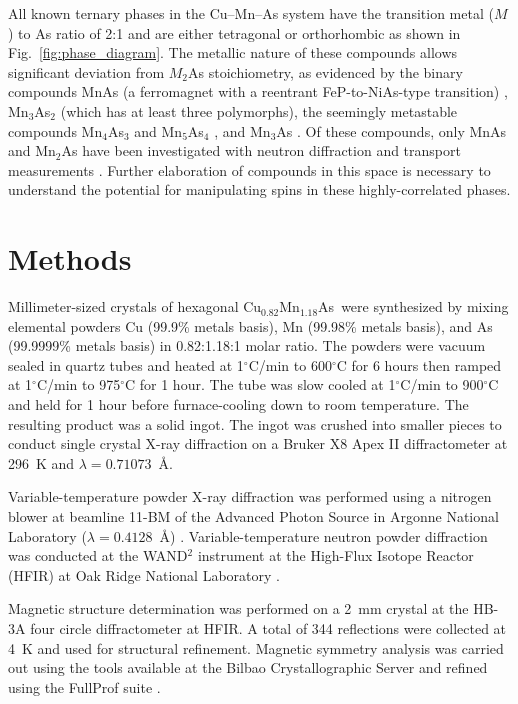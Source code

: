 \documentclass[10pt,doublespacing,edeposit]{uiucthesis2020}
\newcommand*{\cumnas}{Cu$_{0.82}$Mn$_{1.18}$As}
\begin{document}
\begin{mainmatter}
{\color{black} All known ternary phases in the Cu--Mn--As system have the transition metal ($M$) to As ratio of 2:1 and are either tetragonal or orthorhombic as shown in Fig.\ \ref{fig:phase_diagram}.}
The metallic nature of these compounds allows significant deviation from $M_2$As stoichiometry, as evidenced by the binary compounds MnAs (a ferromagnet with a reentrant FeP-to-NiAs-type transition) \cite{Pytlik1985,Schwartz1971,Glazkov2003}, Mn$_3$As$_2$ (which has at least three polymorphs)\cite{Dietrich1990,Moller1993,Hagedorn1994}, the seemingly metastable compounds Mn$_4$As$_3$ and Mn$_5$As$_4$ \cite{Hagedorn1995,Moller1993}, and Mn$_3$As \cite{nowotny_kristallchemische_1951}.
Of these compounds, only MnAs and Mn$_2$As have been investigated with neutron diffraction and transport measurements \cite{Yuzuri1960,Austin1962}.
Further elaboration of compounds in this space is necessary to understand the potential for manipulating spins in these highly-correlated phases.

\section{Methods}

Millimeter-sized crystals of hexagonal \cumnas\ were synthesized by mixing elemental powders Cu (99.9\% metals basis), Mn (99.98\% metals basis), and As (99.9999\% metals basis) in 0.82:1.18:1 molar ratio. 
The powders were vacuum sealed in quartz tubes and heated at 1$^\circ$C/min to 600$^{\circ}$C for 6 hours then ramped at 1$^{\circ}$C/min to 975$^{\circ}$C for 1 hour. The tube was slow cooled at 1$^{\circ}$C/min to 900$^{\circ}$C and held for 1 hour before furnace-cooling down to room temperature. The resulting product was a solid ingot. The ingot was crushed into smaller pieces to conduct single crystal X-ray diffraction on a Bruker X8 Apex II diffractometer at 296~K and $\lambda = 0.71073$~\AA. 


Variable-temperature powder X-ray diffraction was performed using a nitrogen blower at beamline 11-BM of the Advanced Photon Source in Argonne National Laboratory ($\lambda = 0.4128$~\AA) \cite{wang_dedicated_2008}. Variable-temperature neutron powder diffraction was conducted at the WAND$^2$ instrument at the High-Flux Isotope Reactor (HFIR) at Oak Ridge National Laboratory \cite{Frontzek_new}.


Magnetic structure determination was performed on a 2~mm crystal at the HB-3A four circle diffractometer at HFIR. A total of 344 reflections were collected at 4~K and used for structural refinement. Magnetic symmetry analysis was carried out using the tools available at the Bilbao Crystallographic Server \cite{Perez-Mato2015}
and refined using the FullProf suite \cite{rodriguez-carvajal_recent_1993}.


\end{mainmatter}
\end{document}
